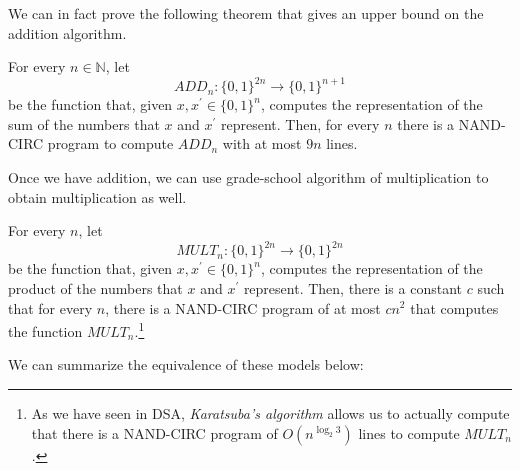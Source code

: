   We can in fact prove the following theorem that gives an upper bound on the addition algorithm. 

  \begin{theorem}
    For every $n \in \mathbb{N}$, let 
    \begin{equation}
      ADD_n : \{0,1\}^{2n} \longrightarrow \{0,1\}^{n+1}
    \end{equation}
    be the function that, given $x, x^\prime \in \{0,1\}^n$, computes the representation of the sum of the numbers that $x$ and $x^\prime$ represent. Then, for every $n$ there is a NAND-CIRC program to compute $ADD_n$ with at most $9n$ lines. 
  \end{theorem}

  Once we have addition, we can use grade-school algorithm of multiplication to obtain multiplication as well. 

  \begin{theorem}
    For every $n$, let 
    \begin{equation}
      MULT_n : \{0,1\}^{2n} \longrightarrow \{0,1\}^{2n}
    \end{equation}
    be the function that, given $x, x^\prime \in \{0,1\}^n$, computes the representation of the product of the numbers that $x$ and $x^\prime$ represent. Then, there is a constant $c$ such that for every $n$, there is a NAND-CIRC program of at most $cn^2$ that computes the function $MULT_n$.\footnote{As we have seen in DSA, \textit{Karatsuba's algorithm} allows us to actually compute that there is a NAND-CIRC program of $O(n^{\log_2 3})$ lines to compute $MULT_n$. }
  \end{theorem}

  We can summarize the equivalence of these models below: 

  \begin{center}
  \end{center}

